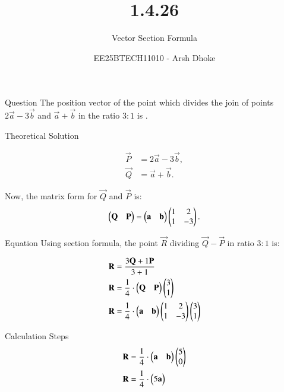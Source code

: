 \documentclass{beamer}
\title{1.4.26}
\subtitle{Vector Section Formula}
\author{EE25BTECH11010 - Arsh Dhoke}
\date{}
\begin{document}
\begin{frame}
\titlepage
\end{frame}

\begin{frame}{Question}
The position vector of the point which divides the join of points 
$2\vec{a} - 3\vec{b}$ and $\vec{a} + \vec{b}$
in the ratio $3:1$ is \underline{\hspace{2cm}}.
\end{frame}

\begin{frame}{Theoretical Solution}

\begin{align}
    \vec{P} &= 2\vec{a}-3\vec{b},  \label{eq:1} \\ 
    \vec{Q} &= \vec{a}+\vec{b}. \label{eq:2}
\end{align}

Now, the matrix form for $\vec{Q}$ and $\vec{P}$ is:
\begin{align}
\begin{pmatrix}\mathbf{Q} & \mathbf{P}\end{pmatrix}
= \begin{pmatrix}\mathbf{a} & \mathbf{b}\end{pmatrix}
\begin{pmatrix}1 & 2 \\ 1 & -3\end{pmatrix}. \label{eq:3}
\end{align}
\end{frame}

\begin{frame}{Equation}
Using section formula, the point $\vec{R}$ dividing $\vec{Q} - \vec{P}$ in ratio $3:1$ is:

\begin{align}
\mathbf{R} &= \frac{3\mathbf{Q} + 1\mathbf{P}}{3+1} \label{eq:4} \\
\mathbf{R} &= \frac{1}{4} \cdot \begin{pmatrix}\mathbf{Q} & \mathbf{P}\end{pmatrix} \begin{pmatrix}3 \\ 1\end{pmatrix}\label{eq:5} \\
\mathbf{R} &= \frac{1}{4} \cdot \begin{pmatrix}\mathbf{a} & \mathbf{b}\end{pmatrix}\begin{pmatrix}1 & 2 \\ 1 & -3\end{pmatrix} \begin{pmatrix}3 \\ 1\end{pmatrix} \label{eq:6} 
\end{align}

\end{frame}

\begin{frame}{Calculation Steps}
\begin{align}
\mathbf{R} &= \frac{1}{4} \cdot \begin{pmatrix}\mathbf{a} & \mathbf{b}\end{pmatrix} \begin{pmatrix}5 \\ 0\end{pmatrix} \label{eq:7} \\
\mathbf{R} &= \frac{1}{4} \cdot \begin{pmatrix}5\mathbf{a}\end{pmatrix} \label{eq:8} 
\end{align}
\end{frame}
\end{document}
